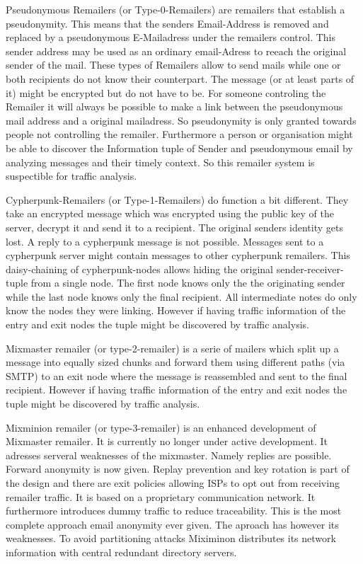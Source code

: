 Pseudonymous Remailers (or Type-0-Remailers) are remailers that establish a pseu\-do\-ny\-mi\-ty. This means that the senders Email-Address is removed and replaced by a pseudonymous E-Mailadress under the remailers control. This sender address may be used as an ordinary email-Adress to reeach the original sender of the mail. These types of Remailers allow to send mails while one or both recipients do not know their counterpart. The message (or at least parts of it) might be encrypted but do not have to be. For someone controling the Remailer it will always be possible to make a link between the pseudonymous mail address and a original mailadress. So pseudonymity is only granted towards people not controlling the remailer. Furthermore a person or organisation might be able to discover the Information tuple of Sender and pseudonymous email by analyzing messages and their timely context. So this remailer system is suspectible for traffic analysis.\par

Cypherpunk-Remailers (or Type-1-Remailers) do function a bit different. They take an encrypted message which was encrypted using the public key of the server, decrypt it and send it to a recipient. The original senders identity gets lost. A reply to a cypherpunk message is not possible. Messages sent to a cypherpunk server might contain messages to other cypherpunk remailers. This daisy-chaining of cypherpunk-nodes allows hiding the original sender-receiver-tuple from a single node. The first node knows only the the originating sender while the last node knows only the final recipient. All intermediate notes do only know the nodes they were linking. However if having traffic information of the entry and exit nodes the tuple might be discovered by traffic analysis.\par

Mixmaster remailer (or type-2-remailer) is a serie of mailers which split up a message into equally sized chunks and forward them using different paths (via SMTP) to an exit node where the message is reassembled and sent to the final recipient. However if having traffic information of the entry and exit nodes the tuple might be discovered by traffic analysis.\par

Mixminion remailer (or type-3-remailer) is an enhanced development of Mixmaster remailer. It is currently no longer under active development. It adresses serveral weaknesses of the mixmaster. Namely replies are possible. Forward anonymity is now given. Replay prevention and key rotation is part of the design and there are exit policies allowing ISPs to opt out from receiving remailer traffic. It is based on a proprietary communication network. It furthermore introduces dummy traffic to reduce traceability. This is the most complete approach email anonymity ever given. The aproach has however its weaknesses. To avoid partitioning attacks Miximinon distributes its network information with central redundant directory servers.\par

